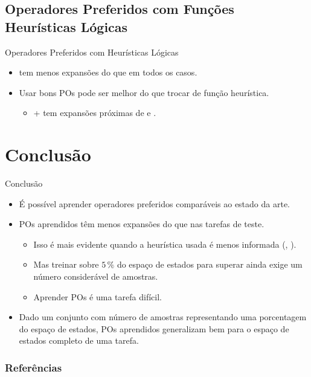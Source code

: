 \documentclass{beamer}
\begin{document}
\subsection{Operadores Preferidos com Funções Heurísticas Lógicas}
\begin{frame}{Operadores Preferidos com Heurísticas Lógicas}

\begin{itemize}
  \item \pog \alert{tem menos expansões do que} \poff em todos os casos.
  \pause
  \item Usar bons POs pode ser \alert{melhor} do que trocar de função heurística.
    \begin{itemize}
       \item \hgc + \pog tem expansões próximas de \hff e \hadd.
    \end{itemize}
\end{itemize}
\end{frame}


\section{Conclusão}
\begin{frame}{Conclusão}
\begin{itemize}
  \item É possível aprender operadores preferidos \alert{comparáveis ao estado da arte}.
  \pause
  \item POs aprendidos \pog têm \alert{menos expansões} do que \poff nas tarefas de teste.
  \pause
    \begin{itemize}
      \item Isso é mais evidente quando a heurística usada é menos informada (\hgc, \hblind).
      \pause
      \item Mas treinar sobre $5\,\%$ do espaço de estados para superar \poff ainda exige um número considerável de amostras.
      \pause
      \item Aprender POs é uma tarefa \alert{difícil}.
    \end{itemize}
  \pause
  \item Dado um conjunto com número de amostras representando uma porcentagem do espaço de estados, POs aprendidos \alert{generalizam bem} para o espaço de estados completo de uma tarefa.
\end{itemize}
\end{frame}

\begin{frame}[allowframebreaks]
\frametitle{Referências}
\printbibliography
\end{frame}
\end{document}

